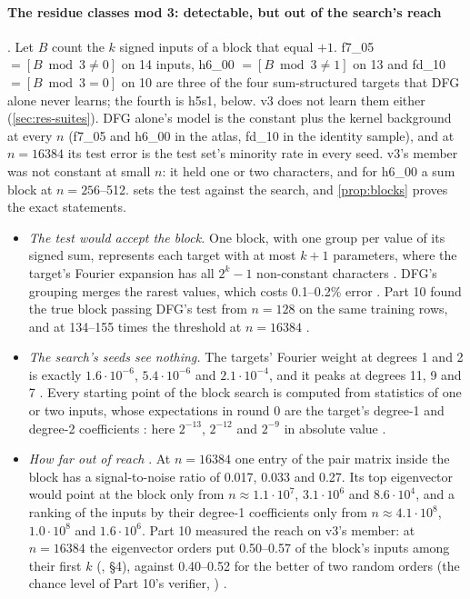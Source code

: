 \paragraph{The residue classes mod 3: detectable, but out of the search's reach} . Let $B$ count the $k$ signed inputs of a block that equal $+1$. f7\_05 $=[B\bmod3\ne0]$ on 14 inputs, h6\_00 $=[B\bmod3\ne1]$ on 13 and fd\_10 $=[B\bmod3=0]$ on 10 are three of the four sum-structured targets that DFG alone never learns; the fourth is h5s1, below. v3 does not learn them either (\cref{sec:res-suites}). DFG alone's model is the constant plus the kernel background at every $n$ (f7\_05 and h6\_00 in the atlas, fd\_10 in the identity sample), and at $n=16384$ its test error is the test set's minority rate in every seed. v3's member was not constant at small $n$: it held one or two characters, and for h6\_00 a sum block at $n=256$--512.  sets the test against the search, and \cref{prop:blocks} proves the exact statements.
\begin{itemize}
\item \emph{The test would accept the block.} One block, with one group per value of its signed sum, represents each target with at most $k+1$ parameters, where the target's Fourier expansion has all $2^k-1$ non-constant characters . DFG's grouping merges the rarest values, which costs 0.1--0.2\% error . Part 10 found the true block passing DFG's test from $n=128$ on the same training rows, and at 134--155 times the threshold at $n=16384$ .
\item \emph{The search's seeds see nothing.} The targets' Fourier weight at degrees 1 and 2 is exactly $1.6\cdot10^{-6}$, $5.4\cdot10^{-6}$ and $2.1\cdot10^{-4}$, and it peaks at degrees 11, 9 and 7 . Every starting point of the block search is computed from statistics of one or two inputs, whose expectations in round 0 are the target's degree-1 and degree-2 coefficients : here $2^{-13}$, $2^{-12}$ and $2^{-9}$ in absolute value .
\item \emph{How far out of reach} . At $n=16384$ one entry of the pair matrix inside the block has a signal-to-noise ratio of 0.017, 0.033 and 0.27. Its top eigenvector would point at the block only from $n\approx1.1\cdot10^7$, $3.1\cdot10^6$ and $8.6\cdot10^4$, and a ranking of the inputs by their degree-1 coefficients only from $n\approx4.1\cdot10^8$, $1.0\cdot10^8$ and $1.6\cdot10^6$. Part 10 measured the reach on v3's member: at $n=16384$ the eigenvector orders put 0.50--0.57 of the block's inputs among their first $k$ (, \S4), against 0.40--0.52 for the better of two random orders (the chance level of Part 10's verifier, ) .
\end{itemize}
